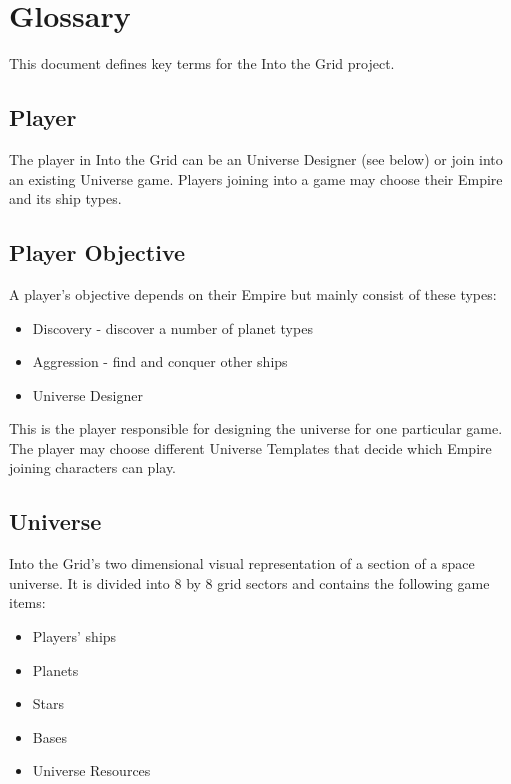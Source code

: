 \chapter{Glossary}

This document defines key terms for the Into the Grid project.

\section{Player}

The player in Into the Grid can be an Universe Designer (see below) or join into an existing Universe game. Players joining into a game may choose their Empire and its ship types.

\section{Player Objective}


A player's objective depends on their Empire but mainly consist of these types:

\begin{itemize}
	\item Discovery - discover a number of planet types
	\item Aggression - find and conquer other ships
	\item Universe Designer
\end{itemize}

This is the player responsible for designing the universe for one particular game. The player may choose different Universe Templates that decide which Empire joining characters can play.

\section{Universe}

Into the Grid's two dimensional visual representation of a section of a space universe.
It is divided into 8 by 8 grid sectors and contains the following game items:

\begin{itemize}
	\item Players' ships
	\item Planets
	\item Stars
	\item Bases
	\item Universe Resources
\end{itemize}


